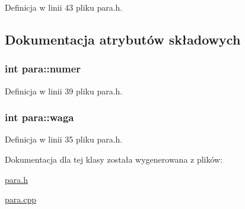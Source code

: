 Definicja w linii 43 pliku para.\-h.



\subsection{Dokumentacja atrybutów składowych}
\hypertarget{classpara_ad00013e542cdbfd535beca41cb8d1e1f}{
\subsubsection[{numer}]{\setlength{\rightskip}{0pt plus 5cm}int para\-::numer}}\label{classpara_ad00013e542cdbfd535beca41cb8d1e1f}


Definicja w linii 39 pliku para.\-h.

\hypertarget{classpara_a6ccf50eedaaef6b86ec2c051af6ccf8d}{
\subsubsection[{waga}]{\setlength{\rightskip}{0pt plus 5cm}int para\-::waga}}\label{classpara_a6ccf50eedaaef6b86ec2c051af6ccf8d}


Definicja w linii 35 pliku para.\-h.



Dokumentacja dla tej klasy została wygenerowana z plików\-:\begin{DoxyCompactItemize}
\item 
\hyperlink{para_8h}{para.\-h}\item 
\hyperlink{para_8cpp}{para.\-cpp}\end{DoxyCompactItemize}
